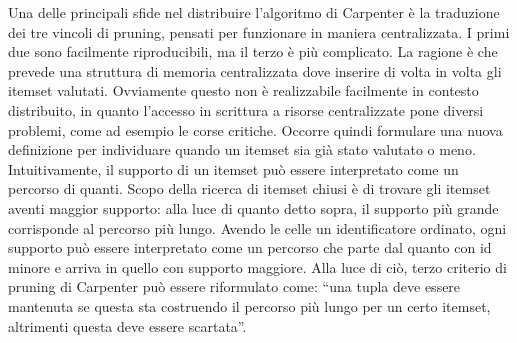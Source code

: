 Una delle principali sfide nel distribuire l'algoritmo di Carpenter è la traduzione dei tre vincoli di pruning, pensati per funzionare in maniera centralizzata.
I primi due sono facilmente riproducibili, ma il terzo è più complicato.
La ragione è che prevede una struttura di memoria centralizzata dove inserire di volta in volta gli itemset valutati.
Ovviamente questo non è realizzabile facilmente in contesto distribuito, in quanto l'accesso in scrittura a risorse centralizzate pone diversi problemi, come ad esempio le corse critiche.
Occorre quindi formulare una nuova definizione per individuare quando un itemset sia già stato valutato o meno.
Intuitivamente, il supporto di un itemset può essere interpretato come un percorso di quanti.
Scopo della ricerca di itemset chiusi è di trovare gli itemset aventi maggior supporto: alla luce di quanto detto sopra, il supporto più grande corrisponde al percorso più lungo.
Avendo le celle un identificatore ordinato, ogni supporto può essere interpretato come un percorso che parte dal quanto con id minore e arriva in quello con supporto maggiore.
Alla luce di ciò, terzo criterio di pruning di Carpenter può essere riformulato come: ``una tupla deve essere mantenuta se questa sta costruendo il percorso più lungo per un certo itemset, altrimenti questa deve essere scartata''.

